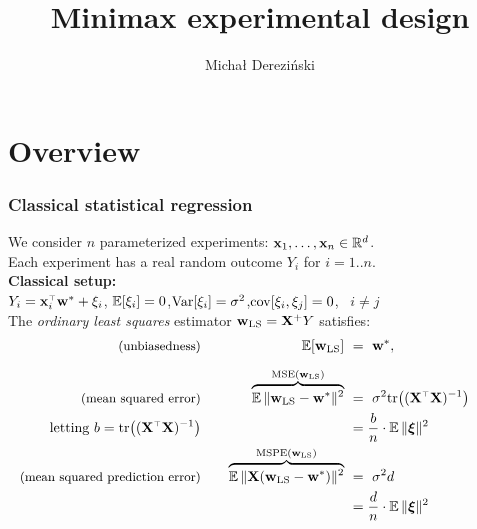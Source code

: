 \documentclass{beamer}
\title[]{Minimax experimental design}
\author[]{Micha{\l } Derezi\'{n}ski}
\begin{document}
\begin{frame}
    \titlepage
\end{frame}

\section{Overview}

\begin{frame}
  \frametitle{Classical statistical regression}
  We consider $n$ parameterized experiments:
  $\mathbf x_1,\dots,\mathbf x_n\in\mathbb R^d$.\\
  Each experiment has a real random outcome $Y_i$ for $i=1..n$.\\[2mm]
  \textbf{Classical setup:}\\
$Y_i=\x_i^\top\w^*+\xi_i$,\quad
  $\mathbb E[\xi_i]=0$,\quad $\mathrm{Var}[\xi_i]=\sigma^2$,\quad $\mathrm{cov}[\xi_i,\xi_j]=0$,
\  $i\neq j$\\[3mm]
The \textit{ordinary least squares} estimator $\mathbf w_{\mathrm{LS}}=\mathbf X^+ Y$ satisfies:
  \begin{align*}
    \text{\small(unbiasedness)}  && \quad \E[\wols]
  \  &=\ \w^*,\\[2mm]
    \text{\small(mean squared error)} &&\quad
\overbrace{\E\,\|\wols-\w^*\|^2}^{\text{MSE}(\wols)}
                                         \   &=\ \sigma^2\tr\big((\X^\top\X)^{-1}\big)\\
    \text{letting }b=\tr\big((\X^\top\X)^{-1}\big)&&&=\frac bn\cdot \E\,\|\xib\|^2\\
\hspace{-8mm}    \text{\small(mean squared prediction error)}
&&\quad \overbrace{\E\,\|\X(\wols-\w^*)\|^2}^{\text{MSPE}(\wols)}
   \  &=\ \sigma^2d \\
    &&&=\frac dn \cdot\E\,\|\xib\|^2
\end{align*}
\end{frame}
\end{document}
